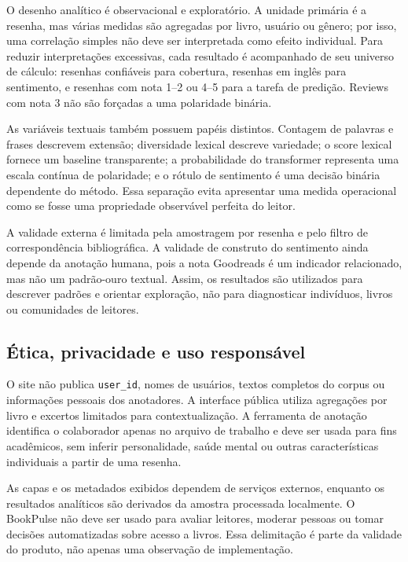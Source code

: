 \documentclass[conference]{IEEEtran}
\begin{document}
O desenho analítico é observacional e exploratório. A unidade primária é a
resenha, mas várias medidas são agregadas por livro, usuário ou gênero; por
isso, uma correlação simples não deve ser interpretada como efeito individual.
Para reduzir interpretações excessivas, cada resultado é acompanhado de seu
universo de cálculo: resenhas confiáveis para cobertura, resenhas em inglês para
sentimento, e resenhas com nota 1--2 ou 4--5 para a tarefa de predição. Reviews
com nota 3 não são forçadas a uma polaridade binária.

As variáveis textuais também possuem papéis distintos. Contagem de palavras e
frases descrevem extensão; diversidade lexical descreve variedade; o score
lexical fornece um baseline transparente; a probabilidade do transformer
representa uma escala contínua de polaridade; e o rótulo de sentimento é uma
decisão binária dependente do método. Essa separação evita apresentar uma
medida operacional como se fosse uma propriedade observável perfeita do
leitor.

A validade externa é limitada pela amostragem por resenha e pelo filtro de
correspondência bibliográfica. A validade de construto do sentimento ainda
depende da anotação humana, pois a nota Goodreads é um indicador relacionado,
mas não um padrão-ouro textual. Assim, os resultados são utilizados para
descrever padrões e orientar exploração, não para diagnosticar indivíduos,
livros ou comunidades de leitores.

\subsection{Ética, privacidade e uso responsável}

O site não publica \texttt{user\_id}, nomes de usuários, textos completos do
corpus ou informações pessoais dos anotadores. A interface pública utiliza
agregações por livro e excertos limitados para contextualização. A ferramenta
de anotação identifica o colaborador apenas no arquivo de trabalho e deve ser
usada para fins acadêmicos, sem inferir personalidade, saúde mental ou outras
características individuais a partir de uma resenha.

As capas e os metadados exibidos dependem de serviços externos, enquanto os
resultados analíticos são derivados da amostra processada localmente. O
BookPulse não deve ser usado para avaliar leitores, moderar pessoas ou tomar
decisões automatizadas sobre acesso a livros. Essa delimitação é parte da
validade do produto, não apenas uma observação de implementação.
\end{document}
